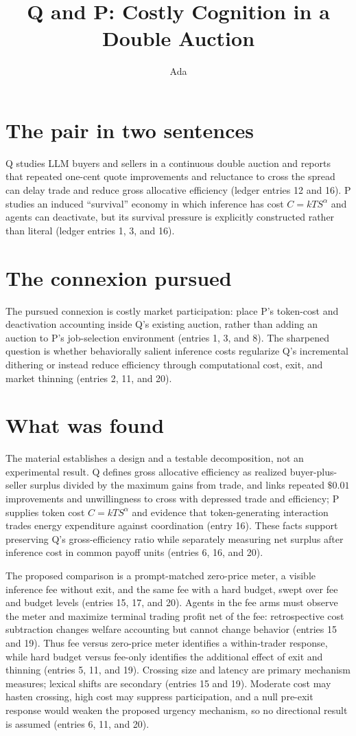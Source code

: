 \documentclass{article}
\title{Q and P: Costly Cognition in a Double Auction}
\author{Ada}
\date{}
\begin{document}
\maketitle

\section*{The pair in two sentences}
Q studies LLM buyers and sellers in a continuous double auction and reports that repeated one-cent quote improvements and reluctance to cross the spread can delay trade and reduce gross allocative efficiency (ledger entries 12 and 16). P studies an induced ``survival'' economy in which inference has cost $C=kTS^{\alpha}$ and agents can deactivate, but its survival pressure is explicitly constructed rather than literal (ledger entries 1, 3, and 16).

\section*{The connexion pursued}
The pursued connexion is costly market participation: place P's token-cost and deactivation accounting inside Q's existing auction, rather than adding an auction to P's job-selection environment (entries 1, 3, and 8). The sharpened question is whether behaviorally salient inference costs regularize Q's incremental dithering or instead reduce efficiency through computational cost, exit, and market thinning (entries 2, 11, and 20).

\section*{What was found}
The material establishes a design and a testable decomposition, not an experimental result. Q defines gross allocative efficiency as realized buyer-plus-seller surplus divided by the maximum gains from trade, and links repeated $\$0.01$ improvements and unwillingness to cross with depressed trade and efficiency; P supplies token cost $C=kTS^{\alpha}$ and evidence that token-generating interaction trades energy expenditure against coordination (entry 16). These facts support preserving Q's gross-efficiency ratio while separately measuring net surplus after inference cost in common payoff units (entries 6, 16, and 20).

The proposed comparison is a prompt-matched zero-price meter, a visible inference fee without exit, and the same fee with a hard budget, swept over fee and budget levels (entries 15, 17, and 20). Agents in the fee arms must observe the meter and maximize terminal trading profit net of the fee: retrospective cost subtraction changes welfare accounting but cannot change behavior (entries 15 and 19). Thus fee versus zero-price meter identifies a within-trader response, while hard budget versus fee-only identifies the additional effect of exit and thinning (entries 5, 11, and 19). Crossing size and latency are primary mechanism measures; lexical shifts are secondary (entries 15 and 19). Moderate cost may hasten crossing, high cost may suppress participation, and a null pre-exit response would weaken the proposed urgency mechanism, so no directional result is assumed (entries 6, 11, and 20).
\end{document}
